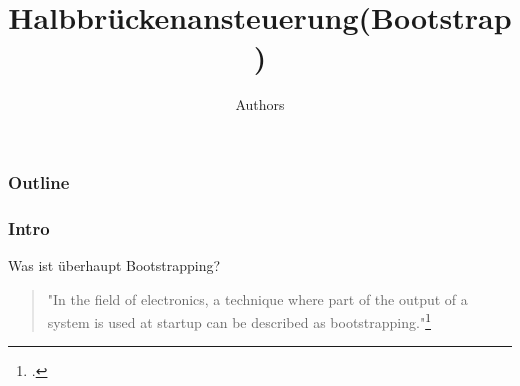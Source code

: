 \documentclass[aspectratio=169,9pt]{beamer}
\title{Halbbrückenansteuerung(Bootstrap)}
\subtitle{}
\author{Authors}
\institute{Institute for Communications Engineering and RF-Systems}
\DeclareRobustCommand\_{\ifmmode\expandafter\subtxt\else\textunderscore\fi}
\begin{document}
%
%


%
%

\maketitle

\begin{frame}
\frametitle{Outline}
  \tableofcontents
\end{frame}

\begin{frame}
\frametitle{Intro}
  Was ist überhaupt Bootstrapping?
  
  \begin{quote}"In the field of electronics, a technique where part of the output of a system is used at startup can be described as bootstrapping."\footcite{https://en.wikipedia.org/wiki/Bootstrapping_(electronics)}
  \end{quote}
\end{frame}
%   
\end{document}
